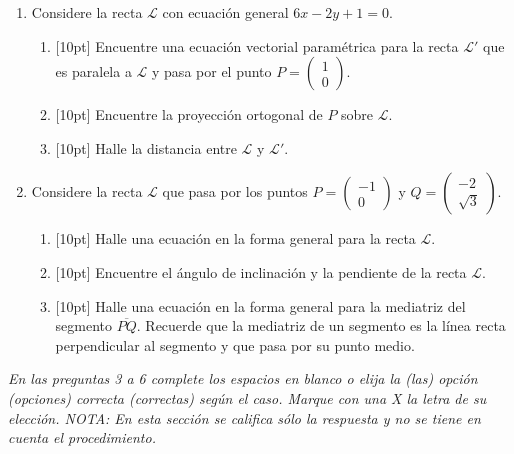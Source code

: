 \documentclass[11pt]{article}
\newcommand{\vect}[2]{\begin{pmatrix}#1\\#2\end{pmatrix}}
\newcommand{\nota}[1]{{\small\itshape\color{unalblue!70!black} #1}}
\begin{document}
\begin{enumerate}
\item Considere la recta $\mathcal{L}$ con ecuación general $6x-2y+1=0$.

\begin{enumerate}[label=(\alph*)]
\item{}[10pt] Encuentre una ecuación vectorial paramétrica para la recta $\mathcal{L}'$ que es paralela a $\mathcal{L}$ y pasa por el punto $P=\vect{1}{0}$.
\item{}[10pt] Encuentre la proyección ortogonal de $P$ sobre $\mathcal{L}$.
\item{}[10pt] Halle la distancia entre $\mathcal{L}$ y $\mathcal{L}'$.
\end{enumerate}

\item Considere la recta $\mathcal{L}$ que pasa por los puntos $P=\vect{-1}{0}$ y $Q=\vect{-2}{\sqrt{3}}$.

\begin{enumerate}[label=(\alph*)]
\item{}[10pt] Halle una ecuación en la forma general para la recta $\mathcal{L}$.
\item{}[10pt] Encuentre el ángulo de inclinación y la pendiente de la recta $\mathcal{L}$.
\item{}[10pt] Halle una ecuación en la forma general para la mediatriz del segmento $\overline{PQ}$. Recuerde que la mediatriz de un segmento es la línea recta perpendicular al segmento y que pasa por su punto medio.
\end{enumerate}
\end{enumerate}

\vspace{6pt}
\nota{En las preguntas 3 a 6 complete los espacios en blanco o elija la (las) opción (opciones) correcta (correctas) según el caso. Marque con una X la letra de su elección. NOTA: En esta sección se califica sólo la respuesta y no se tiene en cuenta el procedimiento.}
\end{document}
